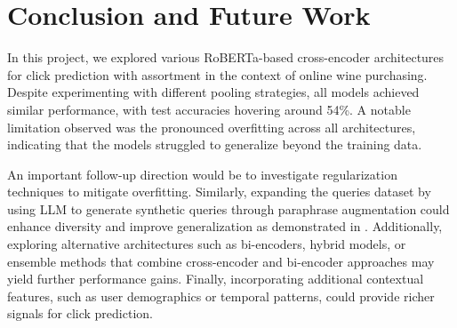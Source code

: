 \documentclass[10pt]{article}
\begin{document}
\section*{Conclusion and Future Work}

In this project, we explored various RoBERTa-based cross-encoder architectures for click prediction with assortment in the context of online wine purchasing. Despite experimenting with different pooling strategies, all models achieved similar performance, with test accuracies hovering around 54\%. A notable limitation observed was the pronounced overfitting across all architectures, indicating that the models struggled to generalize beyond the training data.

An important follow-up direction would be to investigate regularization techniques to mitigate overfitting. Similarly, expanding the queries dataset by using LLM to generate synthetic queries through paraphrase augmentation could enhance diversity and improve generalization as demonstrated in \cite{Abaskohi_2023}. Additionally, exploring alternative architectures such as bi-encoders, hybrid models, or ensemble methods that combine cross-encoder and bi-encoder approaches may yield further performance gains. Finally, incorporating additional contextual features, such as user demographics or temporal patterns, could provide richer signals for click prediction.


  
\end{document}
